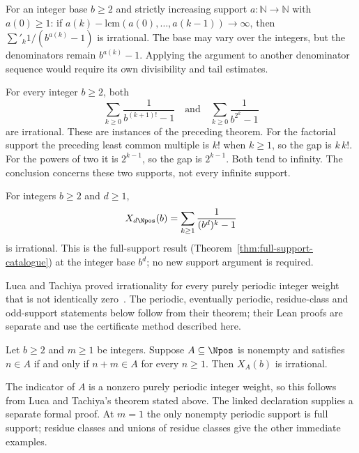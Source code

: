 \begin{thm}
\label{thm:lcm-gap-engine}
For an integer base $b\ge2$ and strictly increasing support $a:\mathbb N\to\mathbb N$ with $a(0)\ge
1$: if $a(k)-\mathrm{lcm}(a(0),\dots,a(k-1))\to\infty$, then $\sum'_k 1/(b^{a(k)}-1)$ is
irrational. The base may vary over the integers, but the denominators remain
$b^{a(k)}-1$.  Applying the argument to another denominator sequence
would require its own divisibility and tail estimates.
\end{thm}

\begin{thm}
\label{thm:factorial-twopow-support}
For every integer $b\ge2$, both
\[
 \sum_{k\ge0}\frac1{b^{(k+1)!}-1}
 \quad\text{and}\quad
 \sum_{k\ge0}\frac1{b^{2^k}-1}
\]
are irrational.  These are instances of the preceding theorem.  For the
factorial support the preceding least common multiple is $k!$ when
$k\ge1$, so the gap is $k\,k!$.  For the powers of two it is
$2^{k-1}$, so the gap is $2^{k-1}$.  Both tend to infinity.
The conclusion concerns these two supports, not every infinite support.
\end{thm}

\begin{thm}
\label{thm:multiples-support}
For integers $b\ge2$ and $d\ge1$,
\[
 X_{d\Npos}(b)=\sum_{k\ge1}\frac1{(b^d)^k-1}
\]
is irrational.  This is the full-support result
(Theorem~\ref{thm:full-support-catalogue}) at the integer base $b^d$;
no new support argument is required.
\end{thm}

Luca and Tachiya proved irrationality for every purely periodic integer weight that is not
identically zero~\cite[Theorem~A, p.~139]{lucatachiya2017}.  The periodic, eventually periodic,
residue-class and odd-support statements below follow from their theorem; their Lean proofs are
separate and use the certificate method described here.

\begin{thm}
\label{thm:periodic-support}
Let $b\ge2$ and $m\ge1$ be integers.  Suppose
$A\subseteq\Npos$ is nonempty and satisfies
$n\in A$ if and only if $n+m\in A$ for every $n\ge1$.
Then $X_A(b)$ is irrational.

The indicator of $A$ is a nonzero purely periodic integer weight,
so this follows from Luca and Tachiya's theorem stated above.
The linked declaration supplies a separate formal proof.
At $m=1$ the only nonempty periodic support is full support;
residue classes and unions of residue classes give the other
immediate examples.
\end{thm}

